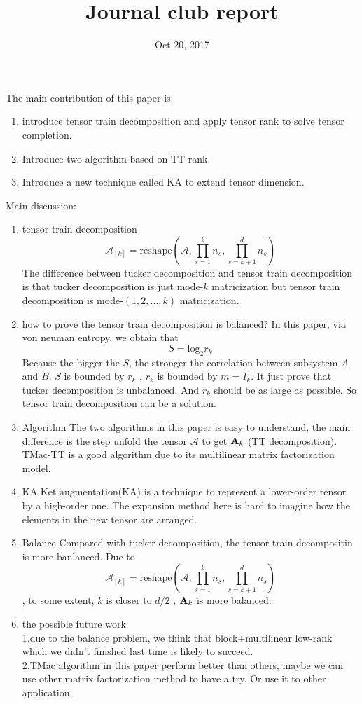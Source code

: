\documentclass[UTF8]{article}
\begin{document}
	\title{Journal club report}	
	\date{Oct 20, 2017} 
	\maketitle
The main contribution of this paper is:
\begin{enumerate}
	\item introduce tensor train decomposition and apply tensor rank to solve tensor completion.
	\item Introduce two algorithm based on TT rank.
	\item Introduce a new technique called KA to extend tensor dimension.
\end{enumerate}

Main discussion:
\begin{enumerate}
	\item  tensor train decomposition
	\begin{equation}
	\mathcal{A}_{[k]}=\text{reshape} (\mathcal{A}, \prod_{s=1}^k n_s,\prod_{s=k+1}^d n_s)
	\end{equation}
	The difference between tucker decomposition and tensor train decomposition is that tucker decomposition is just mode-$k$ matricization but tensor train decomposition is mode-$(1,2,…,k)$  matricization.
	\item how to prove the tensor train decomposition is balanced?
	In this paper, via von neuman entropy, we obtain that 
	\begin{equation}
	S=\text{log}_2 r_k
	\end{equation}
	Because the bigger the $S$, the stronger the correlation between subsystem $A$ and $B$.  $S$ is bounded by $r_k$ , $r_k$ is bounded by  $m=I_k$.
	It just prove that tucker decomposition is unbalanced. And  $r_k$ should be as large as possible. So tensor train decomposition can be a solution.
	\item Algorithm
	The two algorithms in this paper is easy to understand, the main difference is the step unfold the tensor $\mathcal{A}$  to get ${\bf{A}}_k$  (TT decomposition).
	TMac-TT is a good algorithm due to its multilinear matrix factorization model. 
	\item KA 
	Ket augmentation(KA) is a technique to represent a lower-order tensor by a high-order one. The expansion method here is hard to imagine how the elements in the new tensor are arranged.
	\item Balance
	Compared with tucker decomposition, the tensor train decompositin is more banlanced. 
	Due to
		\begin{equation}
	\mathcal{A}_{[k]}=\text{reshape} (\mathcal{A}, \prod_{s=1}^k n_s,\prod_{s=k+1}^d n_s)
	\end{equation}
	,
	to some extent,  $k$ is closer to $d/2$ ,  ${\bf{A}}_k$  is more balanced. 
	\item the possible future work\\
	  1.due to the balance problem, we think that block+multilinear low-rank which we didn’t finished last time is likely to succeed.\\
	  2.TMac algorithm in this paper perform better than others, maybe we can use other matrix factorization method to have a try. Or use it to other application.
\end{enumerate}
\end{document}
